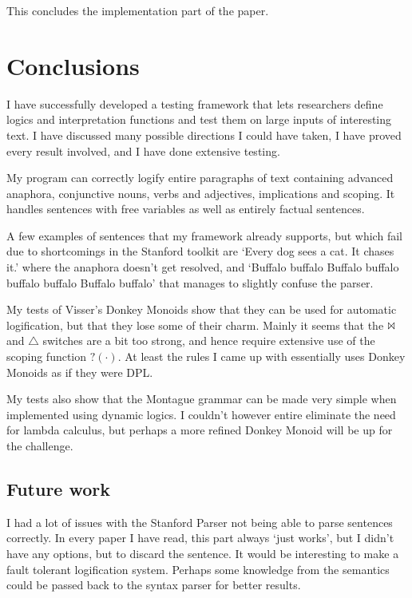 \documentclass[12pt]{article}
\let\stdsection\section
\renewcommand\section{\newpage\stdsection}
\begin{document}
This concludes the implementation part of the paper.

\section{Conclusions}

I have successfully developed a testing framework that lets researchers define logics and interpretation functions and test them on large inputs of interesting text. I have discussed many possible directions I could have taken, I have proved every result involved, and I have done extensive testing.

My program can correctly logify entire paragraphs of text containing advanced anaphora, conjunctive nouns, verbs and adjectives, implications and scoping. It handles sentences with free variables as well as entirely factual sentences.

A few examples of sentences that my framework already supports, but which fail due to shortcomings in the Stanford toolkit are `Every dog sees a cat. It chases it.' where the anaphora doesn't get resolved, and `Buffalo buffalo Buffalo buffalo buffalo buffalo Buffalo buffalo' that manages to slightly confuse the parser.

My tests of Visser's Donkey Monoids show that they can be used for automatic logification, but that they lose some of their charm. Mainly it seems that the $\Bowtie$ and $\triangle$ switches are a bit too strong, and hence require extensive use of the scoping function $?(\cdot)$. At least the rules I came up with essentially uses Donkey Monoids as if they were DPL.

My tests also show that the Montague grammar can be made very simple when implemented using dynamic logics. I couldn't however entire eliminate the need for lambda calculus, but perhaps a more refined Donkey Monoid will be up for the challenge.

\subsection{Future work}

I had a lot of issues with the Stanford Parser not being able to parse sentences correctly. In every paper I have read, this part always `just works', but I didn't have any options, but to discard the sentence. It would be interesting to make a fault tolerant logification system. Perhaps some knowledge from the semantics could be passed back to the syntax parser for better results.
\end{document}
